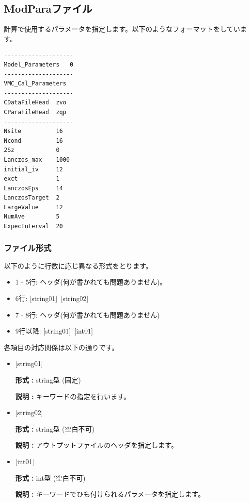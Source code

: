 \subsection{{ModParaファイル}}
\label{Subsec:modpara}
計算で使用するパラメータを指定します。以下のようなフォーマットをしています。\\
\begin{minipage}{10cm}
\begin{screen}
\begin{verbatim}
--------------------
Model_Parameters   0
--------------------
VMC_Cal_Parameters
--------------------
CDataFileHead  zvo
CParaFileHead  zqp
--------------------
Nsite          16   
Ncond          16    
2Sz            0    
Lanczos_max    1000 
initial_iv     12   
exct           1    
LanczosEps     14   
LanczosTarget  2    
LargeValue     12   
NumAve         5    
ExpecInterval  20   
\end{verbatim}
\end{screen}
\end{minipage}

\subsubsection{ファイル形式}
以下のように行数に応じ異なる形式をとります。
 \begin{itemize}
   \item  1 - 5行:  ヘッダ(何が書かれても問題ありません)。
   \item  6行:  [string01]~[string02]
   \item  7 - 8行: ヘッダ(何が書かれても問題ありません)
   \item  9行以降: [string01]~[int01]
  \end{itemize}
各項目の対応関係は以下の通りです。
\begin{itemize}
   \item  $[$string01$]$
   
   {\bf 形式 :} string型 (固定)

  {\bf 説明 :} キーワードの指定を行います。
   
   \item  $[$string02$]$
   
   {\bf 形式 :} string型 (空白不可)

  {\bf 説明 :} アウトプットファイルのヘッダを指定します。

   \item  $[$int01$]$
   
   {\bf 形式 :} int型 (空白不可)

  {\bf 説明 :} キーワードでひも付けられるパラメータを指定します。

  \end{itemize}

